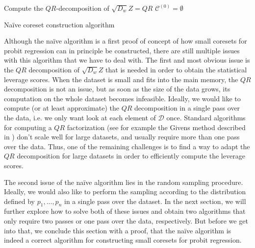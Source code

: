 \begin{algorithm}[ht!]
    \DontPrintSemicolon
    Compute the $QR$-decomposition of $\sqrt{D_w}Z = QR$ \;
    $\mathcal{C}^{(0)} = \emptyset$ \;
    \caption{Na\"ive coreset construction algorithm\label{algo:naive}}
\end{algorithm}

Although the na\"ive algorithm is a first proof of concept of how small coresets
for probit regression can in principle be constructed,
there are still multiple issues with this algorithm that
we have to deal with.
The first and most obvious issue is the $QR$ decomposition of
$\sqrt{D_w}Z$ that is needed in order to obtain
the statistical leverage scores.
When the dataset is small and fits into the main
memory, the $QR$ decomposition is not an issue, but as soon as
the size of the data grows, its computation on the whole dataset
becomes infeasible. Ideally, we would like to compute
(or at least approximate) the $QR$ decomposition in a single
pass over the data, i.e. we only want look at each element
of $\mathcal{D}$ once.
Standard algorithms for computing a $QR$ factorization
(see for example the Givens method described in
\cite{matrix-computations}) don't scale well for large datasets,
and usually require more than one pass over the data.
Thus, one of the remaining challenges is to find a way to
adapt the $QR$ decomposition for large datasets in order
to efficiently compute the leverage scores.

The second issue of the na\"ive algorithm lies in the
random sampling procedure. Ideally, we would also like to
perform the sampling according to the distribution defined
by $p_1, ..., p_n$ in a single pass over the dataset.
In the next section, we will further explore how to solve
both of these issues and obtain two algorithms that only require
two passes or one pass over the data, respectively.
But before we get into that, we conclude this section with a
proof, that the na\"ive algorithm is indeed a correct algorithm
for constructing small coresets for probit regression.

